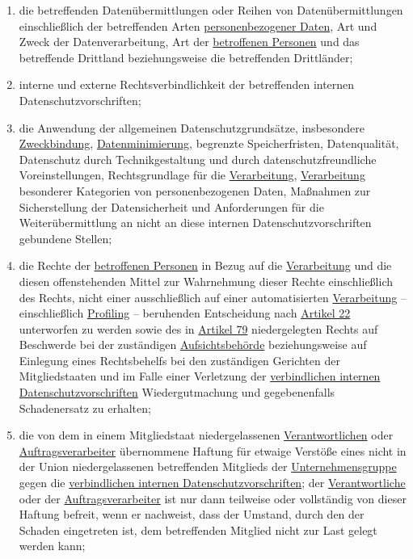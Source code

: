 \begin{enumerate}
\begin{enumerate}
    \item die betreffenden Datenübermittlungen oder Reihen von Datenübermittlungen einschließlich der betreffenden
     Arten
     \hyperref[itm:04-1]{personenbezogener Daten}, Art und Zweck der Datenverarbeitung, Art der \hyperref[itm:04-1]
      {betroffenen Personen} und das betreffende Drittland beziehungsweise die betreffenden Drittländer;%
    \label{itm:47-2b}

    \item interne und externe Rechtsverbindlichkeit der betreffenden internen Datenschutzvorschriften;%
    \label{itm:47-2c}

    \item die Anwendung der allgemeinen Datenschutzgrundsätze, insbesondere \hyperref[itm:05-1b]
     {Zweckbindung}, \hyperref[itm:05-1c]{Datenminimierung}, begrenzte Speicherfristen, Datenqualität, Datenschutz
     durch Technikgestaltung und durch datenschutzfreundliche Voreinstellungen, Rechtsgrundlage für die \hyperref
     [itm:04-2]{Verarbeitung}, \hyperref[itm:04-2]{Verarbeitung} besonderer Kategorien von personenbezogenen Daten,
     Maßnahmen zur Sicherstellung der Datensicherheit und Anforderungen für die Weiterübermittlung an nicht an diese
     internen Datenschutzvorschriften gebundene Stellen;%
    \label{itm:47-2d}

    \item die Rechte der \hyperref[itm:04-1]{betroffenen Personen} in Bezug auf die \hyperref[itm:04-2]
     {Verarbeitung} und die diesen offenstehenden Mittel zur Wahrnehmung dieser Rechte einschließlich des Rechts, nicht
     einer ausschließlich auf einer automatisierten
     \hyperref[itm:04-2]{Verarbeitung} -- einschließlich \hyperref[itm:04-4]{Profiling} -- beruhenden Entscheidung
      nach \hyperref[ch:22]{Artikel 22} unterworfen zu werden sowie des in \hyperref[ch:79]{Artikel 79} niedergelegten
      Rechts auf Beschwerde bei der zuständigen
     \hyperref[itm:04-21]{Aufsichtsbehörde} beziehungsweise auf Einlegung eines Rechtsbehelfs bei den zuständigen
      Gerichten der Mitgliedstaaten und im Falle einer Verletzung der \hyperref[itm:04-20]{verbindlichen internen
      Datenschutzvorschriften} Wiedergutmachung und gegebenenfalls Schadenersatz zu erhalten;%
    \label{itm:47-2e}

    \item die von dem in einem Mitgliedstaat niedergelassenen \hyperref[itm:04-7]{Verantwortlichen} oder \hyperref
     [itm:04-8]{Auftragsverarbeiter} übernommene Haftung für etwaige Verstöße eines nicht in der Union niedergelassenen
     betreffenden Mitglieds der
     \hyperref[itm:04-19]{Unternehmensgruppe} gegen die \hyperref[itm:04-20]{verbindlichen internen
      Datenschutzvorschriften}; der \hyperref[itm:04-7]{Verantwortliche} oder der
     \hyperref[itm:04-8]{Auftragsverarbeiter} ist nur dann teilweise oder vollständig von dieser Haftung befreit, wenn
      er nachweist, dass der Umstand, durch den der Schaden eingetreten ist, dem betreffenden Mitglied nicht zur Last
      gelegt werden kann;%
    \label{itm:47-2f}


\end{enumerate}
\end{enumerate}
